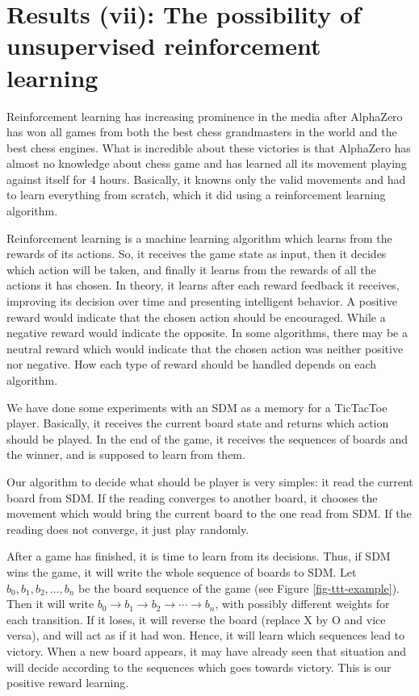 \chapter{Results (vii): The possibility of unsupervised reinforcement learning}

Reinforcement learning has increasing prominence in the media after AlphaZero has won all games from both the best chess grandmasters in the world and the best chess engines. What is incredible about these victories is that AlphaZero has almost no knowledge about chess game and has learned all its movement playing against itself for 4 hours. Basically, it knowns only the valid movements and had to learn everything from scratch, which it did using a reinforcement learning algorithm.

Reinforcement learning is a machine learning algorithm which learns from the rewards of its actions. So, it receives the game state as input, then it decides which action will be taken, and finally it learns from the rewards of all the actions it has chosen. In theory, it learns after each reward feedback it receives, improving its decision over time and presenting intelligent behavior. A positive reward would indicate that the chosen action should be encouraged. While a negative reward would indicate the opposite. In some algorithms, there may be a neutral reward which would indicate that the chosen action was neither positive nor negative. How each type of reward should be handled depends on each algorithm.

We have done some experiments with an SDM as a memory for a TicTacToe player. Basically, it receives the current board state and returns which action should be played. In the end of the game, it receives the sequences of boards and the winner, and is supposed to learn from them.

Our algorithm to decide what should be player is very simples: it read the current board from SDM. If the reading converges to another board, it chooses the movement which would bring the current board to the one read from SDM. If the reading does not converge, it just play randomly.

After a game has finished, it is time to learn from its decisions. Thus, if SDM wins the game, it will write the whole sequence of boards to SDM. Let $b_0, b_1, b_2, \dots, b_n$ be the board sequence of the game (see Figure \ref{fig-ttt-example}). Then it will write $b_0 \rightarrow b_1 \rightarrow b_2 \rightarrow \cdots \rightarrow b_n$, with possibly different weights for each transition. If it loses, it will reverse the board (replace X by O and vice versa), and will act as if it had won. Hence, it will learn which sequences lead to victory. When a new board appears, it may have already seen that situation and will decide according to the sequences which goes towards victory. This is our positive reward learning.

